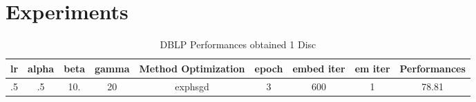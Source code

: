 \documentclass{article}
\begin{document}
    \section{Experiments}
    \begin{table}
            \begin{tabular}{|cccccccc|c|}
                \hline
                lr & alpha & beta & gamma & Method Optimization& epoch & embed iter &em iter & Performances \\
                \hline
                .5 & .5 & 10.& 20 & exphsgd & 3 & 600 & 1 & 78.81 \\
                \hline
            \end{tabular}
        \label{DBLP-RES}
        \caption{DBLP Performances obtained 1 Disc}
    \end{table}
\end{document}
